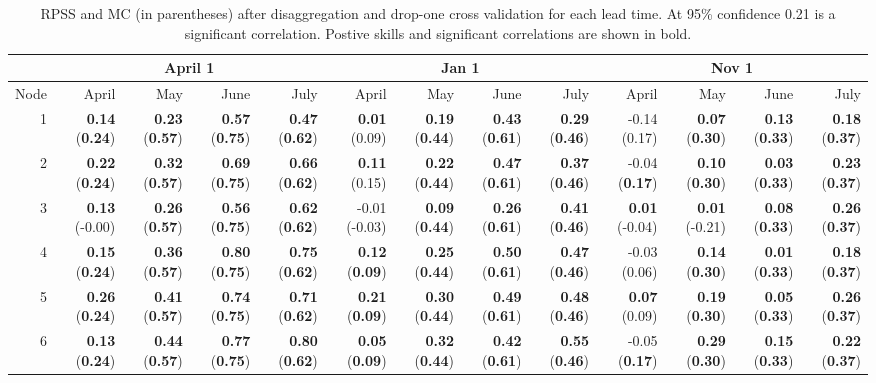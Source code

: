 \begin{sidewaystable}[ht]
\begin{center}\footnotesize
\caption{RPSS and MC (in parentheses) after disaggregation and drop-one cross validation for each lead time. At 95\% confidence 0.21 is a significant correlation. Postive skills and significant correlations are shown in bold.}\label{tab:dropone}
\begin{tabular}{rrrrr|rrrr|rrrr}
  \toprule
  &\multicolumn{4}{c}{April 1} & \multicolumn{4}{c}{Jan 1} & \multicolumn{4}{c}{Nov 1}\\
  \midrule
Node & April & May & June & July & April & May & June & July & April & May & June & July \\ 
  \midrule
1 & {\bf 0.14} ({\bf 0.24}) & {\bf 0.23} ({\bf 0.57}) & {\bf 0.57} ({\bf 0.75}) & {\bf 0.47} ({\bf 0.62}) & {\bf 0.01} (0.09) & {\bf 0.19} ({\bf 0.44}) & {\bf 0.43} ({\bf 0.61}) & {\bf 0.29} ({\bf 0.46}) & -0.14 (0.17) & {\bf 0.07} ({\bf 0.30}) & {\bf 0.13} ({\bf 0.33}) & {\bf 0.18} ({\bf 0.37}) \\ 
  2 & {\bf 0.22} ({\bf 0.24}) & {\bf 0.32} ({\bf 0.57}) & {\bf 0.69} ({\bf 0.75}) & {\bf 0.66} ({\bf 0.62}) & {\bf 0.11} (0.15) & {\bf 0.22} ({\bf 0.44}) & {\bf 0.47} ({\bf 0.61}) & {\bf 0.37} ({\bf 0.46}) & -0.04 ({\bf 0.17}) & {\bf 0.10} ({\bf 0.30}) & {\bf 0.03} ({\bf 0.33}) & {\bf 0.23} ({\bf 0.37}) \\ 
  3 & {\bf 0.13} (-0.00) & {\bf 0.26} ({\bf 0.57}) & {\bf 0.56} ({\bf 0.75}) & {\bf 0.62} ({\bf 0.62}) & -0.01 (-0.03) & {\bf 0.09} ({\bf 0.44}) & {\bf 0.26} ({\bf 0.61}) & {\bf 0.41} ({\bf 0.46}) & {\bf 0.01} (-0.04) & {\bf 0.01} (-0.21) & {\bf 0.08} ({\bf 0.33}) & {\bf 0.26} ({\bf 0.37}) \\ 
  4 & {\bf 0.15} ({\bf 0.24}) & {\bf 0.36} ({\bf 0.57}) & {\bf 0.80} ({\bf 0.75}) & {\bf 0.75} ({\bf 0.62}) & {\bf 0.12} ({\bf 0.09}) & {\bf 0.25} ({\bf 0.44}) & {\bf 0.50} ({\bf 0.61}) & {\bf 0.47} ({\bf 0.46}) & -0.03 (0.06) & {\bf 0.14} ({\bf 0.30}) & {\bf 0.01} ({\bf 0.33}) & {\bf 0.18} ({\bf 0.37}) \\ 
  5 & {\bf 0.26} ({\bf 0.24}) & {\bf 0.41} ({\bf 0.57}) & {\bf 0.74} ({\bf 0.75}) & {\bf 0.71} ({\bf 0.62}) & {\bf 0.21} ({\bf 0.09}) & {\bf 0.30} ({\bf 0.44}) & {\bf 0.49} ({\bf 0.61}) & {\bf 0.48} ({\bf 0.46}) & {\bf 0.07} (0.09) & {\bf 0.19} ({\bf 0.30}) & {\bf 0.05} ({\bf 0.33}) & {\bf 0.26} ({\bf 0.37}) \\ 
  6 & {\bf 0.13} ({\bf 0.24}) & {\bf 0.44} ({\bf 0.57}) & {\bf 0.77} ({\bf 0.75}) & {\bf 0.80} ({\bf 0.62}) & {\bf 0.05} ({\bf 0.09}) & {\bf 0.32} ({\bf 0.44}) & {\bf 0.42} ({\bf 0.61}) & {\bf 0.55} ({\bf 0.46}) & -0.05 ({\bf 0.17}) & {\bf 0.29} ({\bf 0.30}) & {\bf 0.15} ({\bf 0.33}) & {\bf 0.22} ({\bf 0.37}) \\ 

\end{tabular}
\end{center}
\end{sidewaystable}
